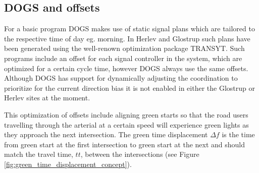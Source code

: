 \subsection{DOGS and offsets}
\label{dogs_offset}

For a basic program DOGS makes use of static signal plans which are tailored to the respective time of day eg. morning. In Herlev and Glostrup such plans have been generated using the well-renown optimization package TRANSYT. Such programs include an offset for each signal controller in the system, which are optimized for a certain cycle time, however DOGS always use the same offsets. Although DOGS has support for dynamically adjusting the coordination to prioritize for the current direction bias it is not enabled in either the Glostrup or Herlev sites at the moment.

This optimization of offsets include aligning green starts so that the road users travelling through the arterial at a certain speed will experience green lights as they approach the next intersection. The green time displacement $\Delta f$ is the time from green start at the first intersection to green start at the next and should match the travel time, $tt$, between the intersections (see Figure \ref{fig:green_time_displacement_concept}). 

